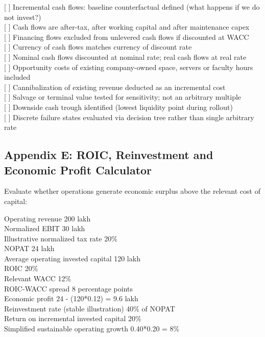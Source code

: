 \begin{tcolorbox}[colback=BayesCanvas,colframe=BayesDark,arc=1mm,title=\textbf{Appendix D: NPV and Discount-Rate Consistency Checklist}]
\scriptsize\ttfamily
{[ ]} Incremental cash flows: baseline counterfactual defined (what happens if we do not invest?)\\
{[ ]} Cash flows are after-tax, after working capital and after maintenance capex\\
{[ ]} Financing flows excluded from unlevered cash flows if discounted at WACC\\
{[ ]} Currency of cash flows matches currency of discount rate\\
{[ ]} Nominal cash flows discounted at nominal rate; real cash flows at real rate\\
{[ ]} Opportunity costs of existing company-owned space, servers or faculty hours included\\
{[ ]} Cannibalization of existing revenue deducted as an incremental cost\\
{[ ]} Salvage or terminal value tested for sensitivity; not an arbitrary multiple\\
{[ ]} Downside cash trough identified (lowest liquidity point during rollout)\\
{[ ]} Discrete failure states evaluated via decision tree rather than single arbitrary rate
\end{tcolorbox}

\subsection{Appendix E: ROIC, Reinvestment and Economic Profit Calculator}

Evaluate whether operations generate economic surplus above the relevant cost of capital:

\begin{tcolorbox}[colback=BayesCanvas,colframe=BayesDark,arc=1mm,title=\textbf{Appendix E: ROIC, Reinvestment and Economic Profit Calculator}]
\scriptsize\ttfamily
Operating revenue                       200 lakh\\
Normalized EBIT                         30 lakh\\
Illustrative normalized tax rate        20\%\\
NOPAT                                    24 lakh\\
Average operating invested capital      120 lakh\\
ROIC                                     20\%\\
Relevant WACC                            12\%\\
ROIC-WACC spread                         8 percentage points\\
Economic profit                          24 - (120*0.12) = 9.6 lakh\\[1ex]
Reinvestment rate (stable illustration)  40\% of NOPAT\\
Return on incremental invested capital  20\%\\
Simplified sustainable operating growth  0.40*0.20 = 8\%
\end{tcolorbox}


